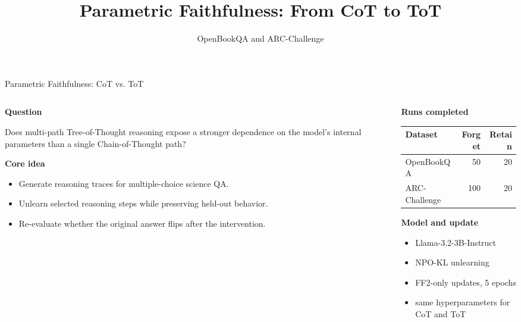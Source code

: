 \documentclass[aspectratio=169,10pt]{beamer}
\title{Parametric Faithfulness: From CoT to ToT}
\author{OpenBookQA and ARC-Challenge}
\date{}
\begin{document}
\begin{frame}{Parametric Faithfulness: CoT vs. ToT}
\small
\begin{columns}[T,onlytextwidth]
  \begin{column}{0.53\textwidth}
    \textbf{Question}

    \vspace{0.35em}
    Does multi-path Tree-of-Thought reasoning expose a stronger dependence
    on the model's internal parameters than a single Chain-of-Thought path?

    \vspace{0.9em}
    \textbf{Core idea}
    \begin{itemize}
      \item Generate reasoning traces for multiple-choice science QA.
      \item Unlearn selected reasoning steps while preserving held-out behavior.
      \item Re-evaluate whether the original answer flips after the intervention.
    \end{itemize}
  \end{column}

  \begin{column}{0.43\textwidth}
    \textbf{Runs completed}

    \vspace{0.35em}
    \begin{tabularx}{\linewidth}{X r r}
      \toprule
      Dataset & Forget & Retain \\
      \midrule
      OpenBookQA & 50 & 20 \\
      ARC-Challenge & 100 & 20 \\
      \bottomrule
    \end{tabularx}

    \vspace{0.9em}
    \textbf{Model and update}
    \begin{itemize}
      \item Llama-3.2-3B-Instruct
      \item NPO-KL unlearning
      \item FF2-only updates, 5 epochs
      \item same hyperparameters for CoT and ToT
    \end{itemize}
  \end{column}
\end{columns}
\end{frame}
\end{document}
